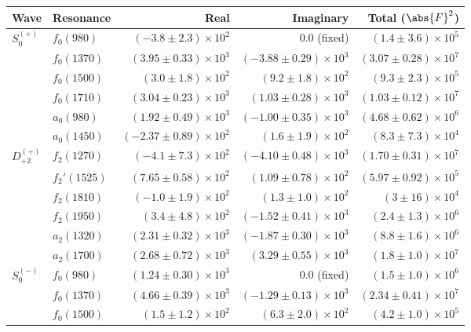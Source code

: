 \begin{table}[ht]
    \begin{center}
        \begin{tabular}{llrrr}\toprule
        Wave & Resonance & Real & Imaginary & Total ($\abs{F}^2$) \\\midrule
$S_{0}^{(+)}$ & $f_{0}(980)$ & $(-3.8 \pm 2.3) \times 10^{2}$ & $0.0$ (fixed) & $(1.4 \pm 3.6) \times 10^{5}$ \\
 & $f_{0}(1370)$ & $(3.95 \pm 0.33) \times 10^{3}$ & $(-3.88 \pm 0.29) \times 10^{3}$ & $(3.07 \pm 0.28) \times 10^{7}$ \\
 & $f_{0}(1500)$ & $(3.0 \pm 1.8) \times 10^{2}$ & $(9.2 \pm 1.8) \times 10^{2}$ & $(9.3 \pm 2.3) \times 10^{5}$ \\
 & $f_{0}(1710)$ & $(3.04 \pm 0.23) \times 10^{3}$ & $(1.03 \pm 0.28) \times 10^{3}$ & $(1.03 \pm 0.12) \times 10^{7}$ \\
 & $a_{0}(980)$ & $(1.92 \pm 0.49) \times 10^{3}$ & $(-1.00 \pm 0.35) \times 10^{3}$ & $(4.68 \pm 0.62) \times 10^{6}$ \\
 & $a_{0}(1450)$ & $(-2.37 \pm 0.89) \times 10^{2}$ & $(1.6 \pm 1.9) \times 10^{2}$ & $(8.3 \pm 7.3) \times 10^{4}$ \\
$D_{+2}^{(+)}$ & $f_{2}(1270)$ & $(-4.1 \pm 7.3) \times 10^{2}$ & $(-4.10 \pm 0.48) \times 10^{3}$ & $(1.70 \pm 0.31) \times 10^{7}$ \\
 & $f_{2}'(1525)$ & $(7.65 \pm 0.58) \times 10^{2}$ & $(1.09 \pm 0.78) \times 10^{2}$ & $(5.97 \pm 0.92) \times 10^{5}$ \\
 & $f_{2}(1810)$ & $(-1.0 \pm 1.9) \times 10^{2}$ & $(1.3 \pm 1.0) \times 10^{2}$ & $(3 \pm 16) \times 10^{4}$ \\
 & $f_{2}(1950)$ & $(3.4 \pm 4.8) \times 10^{2}$ & $(-1.52 \pm 0.41) \times 10^{3}$ & $(2.4 \pm 1.3) \times 10^{6}$ \\
 & $a_{2}(1320)$ & $(2.31 \pm 0.32) \times 10^{3}$ & $(-1.87 \pm 0.30) \times 10^{3}$ & $(8.8 \pm 1.6) \times 10^{6}$ \\
 & $a_{2}(1700)$ & $(2.68 \pm 0.72) \times 10^{3}$ & $(3.29 \pm 0.55) \times 10^{3}$ & $(1.8 \pm 1.0) \times 10^{7}$ \\
$S_{0}^{(-)}$ & $f_{0}(980)$ & $(1.24 \pm 0.30) \times 10^{3}$ & $0.0$ (fixed) & $(1.5 \pm 1.0) \times 10^{6}$ \\
 & $f_{0}(1370)$ & $(4.66 \pm 0.39) \times 10^{3}$ & $(-1.29 \pm 0.13) \times 10^{3}$ & $(2.34 \pm 0.41) \times 10^{7}$ \\
 & $f_{0}(1500)$ & $(1.5 \pm 1.2) \times 10^{2}$ & $(6.3 \pm 2.0) \times 10^{2}$ & $(4.2 \pm 1.0) \times 10^{5}$ \\

\end{tabular}
\end{center}
\end{table}
